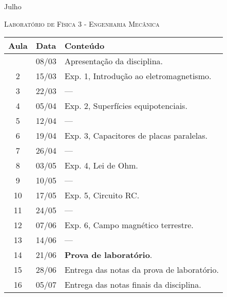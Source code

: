 %
\begin{marginfigure}
    \centering
    Julho\\
\end{marginfigure}
\vspace{1cm}
\begin{center}
\Large\textsc{Laboratório de Física 3 - Engenharia Mecânica}
\end{center}

\begin{center}
\begin{longtable}{ccp{70mm}}
\toprule
Aula & Data & Conteúdo \\
\midrule
\endhead
\bottomrule
\endfoot
1 & 08/03 & Apresentação da disciplina. \\
2 & 15/03 & Exp. 1, Introdução ao eletromagnetismo. \\
3 & 22/03 & --- \\
4 & 05/04 & Exp. 2, Superfícies equipotenciais. \\
5 & 12/04 & --- \\
6 & 19/04 & Exp. 3, Capacitores de placas paralelas. \\
7 & 26/04 & --- \\
8 & 03/05 & Exp. 4, Lei de Ohm. \\
9 & 10/05 & --- \\
10 & 17/05 & Exp. 5, Circuito RC. \\
11 & 24/05 & --- \\
12 & 07/06 & Exp. 6, Campo magnético terrestre. \\
13 & 14/06 & --- \\
14 & 21/06 & \textbf{Prova de laboratório}. \\
15 & 28/06 & Entrega das notas da prova de laboratório. \\ 
16 & 05/07 & Entrega das notas finais da disciplina. \\
\end{longtable}
\end{center}

\cleardoublepage
